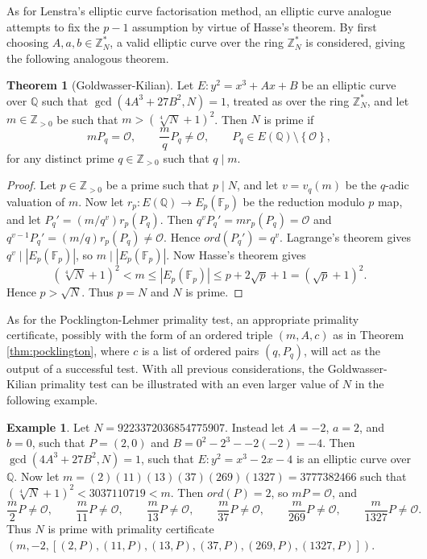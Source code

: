 \documentclass{article}
\newcommand{\F}{\mathbb{F}}
\newcommand{\Z}{\mathbb{Z}}
\newcommand{\Q}{\mathbb{Q}}
\newcommand{\rb}[1]{\left( #1 \right)}
\renewcommand{\sb}[1]{\left[ #1 \right]}
\newcommand{\cb}[1]{\left\{ #1 \right\}}
\newcommand{\abs}[1]{\left\lvert #1 \right\rvert}
\theoremstyle{definition}\newtheorem*{definition}{Definition}
\theoremstyle{definition}\newtheorem*{example}{Example}
\theoremstyle{definition}\newtheorem*{remark}{Remark}
\newtheorem{theorem}[proposition]{Theorem}
\begin{document}
As for Lenstra's elliptic curve factorisation method, an elliptic curve analogue attempts to fix the $ p - 1 $ assumption by virtue of Hasse's theorem. By first choosing $ A, a, b \in \Z_N^* $, a valid elliptic curve over the ring $ \Z_N^* $ is considered, giving the following analogous theorem.

\begin{theorem}[Goldwasser-Kilian]
Let $ E : y^2 = x^3 + Ax + B $ be an elliptic curve over $ \Q $ such that $ \gcd\rb{4A^3 + 27B^2, N} = 1 $, treated as over the ring $ \Z_N^* $, and let $ m \in \Z_{> 0} $ be such that $ m > \rb{\sqrt[4]{N} + 1}^2 $. Then $ N $ is prime if
$$ mP_q = \mathcal{O}, \qquad \dfrac{m}{q}P_q \ne \mathcal{O}, \qquad P_q \in E\rb{\Q} \setminus \cb{\mathcal{O}}, $$
for any distinct prime $ q \in \Z_{> 0} $ such that $ q \mid m $.
\end{theorem}

\begin{proof}
Let $ p \in \Z_{> 0} $ be a prime such that $ p \mid N $, and let $ v = v_q\rb{m} $ be the $ q $-adic valuation of $ m $. Now let $ r_p : E\rb{\Q} \to E_p\rb{\F_p} $ be the reduction modulo $ p $ map, and let $ P_q' = \rb{m / q^v}r_p\rb{P_q} $. Then $ q^vP_q' = mr_p\rb{P_q} = \mathcal{O} $ and $ q^{v - 1}P_q' = \rb{m / q}r_p\rb{P_q} \ne \mathcal{O} $. Hence $ ord\rb{P_q'} = q^v $. Lagrange's theorem gives $ q^v \mid \abs{E_p\rb{\F_p}} $, so $ m \mid \abs{E_p\rb{\F_p}} $. Now Hasse's theorem gives
$$ \rb{\sqrt[4]{N} + 1}^2 < m \le \abs{E_p\rb{\F_p}} \le p + 2\sqrt{p} + 1 = \rb{\sqrt{p} + 1}^2. $$
Hence $ p > \sqrt{N} $. Thus $ p = N $ and $ N $ is prime.
\end{proof}

As for the Pocklington-Lehmer primality test, an appropriate primality certificate, possibly with the form of an ordered triple $ \rb{m, A, c} $ as in Theorem \ref{thm:pocklington}, where $ c $ is a list of ordered pairs $ \rb{q, P_q} $, will act as the output of a successful test. With all previous considerations, the Goldwasser-Kilian primality test can be illustrated with an even larger value of $ N $ in the following example.

\begin{example}
Let $ N = 9223372036854775907 $. Instead let $ A = -2 $, $ a = 2 $, and $ b = 0 $, such that $ P = \rb{2, 0} $ and $ B = 0^2 - 2^3 - -2\rb{-2} = -4 $. Then $ \gcd\rb{4A^3 + 27B^2, N} = 1 $, such that $ E : y^2 = x^3 - 2x - 4 $ is an elliptic curve over $ \Q $. Now let $ m = \rb{2}\rb{11}\rb{13}\rb{37}\rb{269}\rb{1327} = 3777382466 $ such that $ \rb{\sqrt[4]{N} + 1}^2 < 3037110719 < m $. Then $ ord\rb{P} = 2 $, so $ mP = \mathcal{O} $, and
$$ \dfrac{m}{2}P \ne \mathcal{O}, \qquad \dfrac{m}{11}P \ne \mathcal{O}, \qquad \dfrac{m}{13}P \ne \mathcal{O}, \qquad \dfrac{m}{37}P \ne \mathcal{O}, \qquad \dfrac{m}{269}P \ne \mathcal{O}, \qquad \dfrac{m}{1327}P \ne \mathcal{O}. $$
Thus $ N $ is prime with primality certificate $ \rb{m, -2, \sb{\rb{2, P}, \rb{11, P}, \rb{13, P}, \rb{37, P}, \rb{269, P}, \rb{1327, P}}} $.
\end{example}
\end{document}
